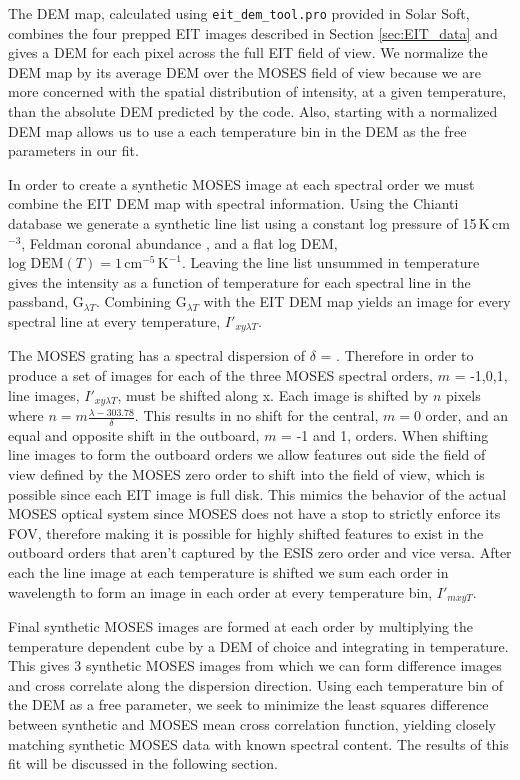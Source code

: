 		
		The DEM map, calculated using \texttt{eit\_dem\_tool.pro} provided in Solar Soft, combines the four prepped EIT images described in Section \ref{sec:EIT_data} and gives a DEM for each pixel across the full EIT field of view.
		We normalize the DEM map by its average DEM over the MOSES field of view because we are more concerned with the spatial distribution of intensity, at a given temperature, than the absolute DEM predicted by the code.
		Also, starting with a normalized DEM map allows us to use a each temperature bin in the DEM as the free parameters in our fit.

		In order to create a synthetic MOSES image at each spectral order we must combine the EIT DEM map with spectral information.
		Using the Chianti database we generate a synthetic line list using a constant log pressure of 15\,K\,cm$^{-3}$, Feldman coronal abundance \citep{FeldmanAbund}, and a flat log DEM, $\text{log DEM}(T) = 1\,\text{cm}^{-5}\,\text{K}^{-1}$.
		Leaving the line list unsummed in temperature gives the intensity as a function of temperature for each spectral line in the passband, G$_{\lambda T}$.
		Combining G$_{\lambda T}$ with the EIT DEM map yields an image for every spectral line at every temperature, $I'_{xy\lambda T}$.
		
		The MOSES grating has a spectral dispersion of $\delta$ = \spectdisperspix.
		Therefore in order to produce a set of images for each of the three MOSES spectral orders, $m$ = -1,0,1, line images, $I'_{xy\lambda T}$, must be shifted along x.
		Each image is shifted by $n$ pixels where $n = m\frac{\lambda - 303.78}{\delta}$.
		This results in no shift for the central, $m = 0$ order, and an equal and opposite shift in the outboard, $m$ = -1 and 1, orders.
		When shifting line images to form the outboard orders we allow features out side the field of view defined by the MOSES zero order to shift into the field of view, which is possible since each EIT image is full disk.
		This mimics the behavior of the actual MOSES optical system since MOSES does not have a stop to strictly enforce its FOV, therefore making it is possible for highly shifted features to exist in the outboard orders that aren't captured by the ESIS zero order and vice versa.
		After each the line image at each temperature is shifted we sum each order in wavelength to form an image in each order at every temperature bin, $I'_{mxyT}$.
		     	
		Final synthetic MOSES images are formed at each order by multiplying the temperature dependent cube by a DEM of choice and integrating in temperature.
		This gives 3 synthetic MOSES images from which we can form difference images and cross correlate along the dispersion direction.
		Using each temperature bin of the DEM as a free parameter, we seek to minimize the least squares difference between synthetic and MOSES mean cross correlation function, yielding closely matching synthetic MOSES data with known spectral content.
		The results of this fit will be discussed in the following section.
		
